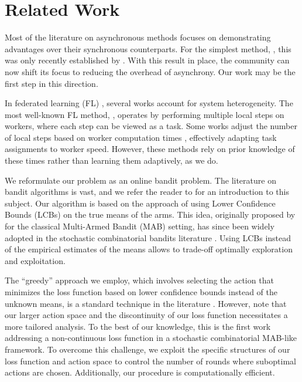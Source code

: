 \section{Related Work}
\label{section:related}

Most of the literature on asynchronous methods focuses on demonstrating advantages over their synchronous counterparts. For the simplest method, , this was only recently established by \citet{tyurin2024optimal}. With this result in place, the community can now shift its focus to reducing the overhead of asynchrony. Our work may be the first step in this direction.

In federated learning (FL) \citep{konevcny2016federated,mcmahan2016federated,kairouz2021advances}, several works account for system heterogeneity. The most well-known FL method,  \citep{mcmahan2017communication}, operates by performing multiple local steps on workers, where each step can be viewed as a task. Some works adjust the number of local steps based on worker computation times \citep{li2020federated, maranjyan2022gradskip}, effectively adapting task assignments to worker speed. However, these methods rely on prior knowledge of these times rather than learning them adaptively, as we do.

We reformulate our problem as an online bandit problem. The literature on bandit algorithms is vast, and we refer the reader to \citet{LattimoreS18} for an introduction to this subject.
Our algorithm is based on the approach of using Lower Confidence Bounds (LCBs) on the true means of the arms. This idea, originally proposed by \citet{auer2002finite} for the classical Multi-Armed Bandit (MAB) setting, has since been widely adopted in the stochastic combinatorial bandits literature \citep{gai2012combinatorial, chen2013combinatorial, combes2015combinatorial, kveton2015tight}. Using LCBs instead of the empirical estimates of the means allows to trade-off optimally exploration and exploitation.

The ``greedy'' approach we employ, which involves selecting the action that minimizes the loss function based on lower confidence bounds instead of the unknown means, is a standard technique in the literature \citep{chen2013combinatorial, lin2015stochastic}.
However, note that our larger action space and the discontinuity of our loss function necessitates a more tailored analysis.
To the best of our knowledge, this is the first work addressing a non-continuous loss function in a stochastic combinatorial MAB-like framework.
To overcome this challenge, we exploit the specific structures of our loss function and action space to control the number of rounds where suboptimal actions are chosen.
Additionally, our procedure is computationally efficient.
